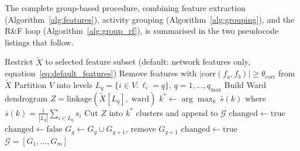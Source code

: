 \medskip
\noindent
The complete group-based procedure, combining feature extraction
(Algorithm~\ref{alg:features}), activity grouping
(Algorithm~\ref{alg:grouping}), and the R\&F loop
(Algorithm~\ref{alg:group_rf}), is summarised in the two
pseudocode listings that follow.
\begin{algorithm}[ht]
\caption{ML-based activity grouping}
\label{alg:grouping}
\begin{algorithmic}[1]
\State Restrict $\tilde{X}$ to selected feature subset
       (default: network features only,
        equation~\ref{eq:default_features})
\State Remove features with
       $|\mathrm{corr}(f_a,f_b)|\geq\theta_{\mathrm{corr}}$
       from $\tilde{X}$
\State Partition $V$ into levels
       $L_q=\{i\in V:\ell_i=q\}$,
       $q=1,\ldots,q_{\max}$
    \State Build Ward dendrogram
           $Z=\mathrm{linkage}(\tilde{X}[L_q],\;\mathrm{ward})$
    \State $k^*\leftarrow\arg\max_k\,\bar{s}(k)$
           where $\bar{s}(k)=\frac{1}{|L_q|}\sum_{i\in L_q}s_i$
    \State Cut $Z$ into $k^*$ clusters and append to
           $\mathcal{G}$
\EndFor
\State $\mathrm{changed}\leftarrow\mathrm{true}$
    \State $\mathrm{changed}\leftarrow\mathrm{false}$
            \State $G_g\leftarrow G_g\cup G_{g+1}$,
                   remove $G_{g+1}$
            \State $\mathrm{changed}\leftarrow\mathrm{true}$
        \EndIf
    \EndFor
\EndWhile
\State \Return $\mathcal{G}=[G_1,\ldots,G_m]$
\end{algorithmic}
\end{algorithm}

